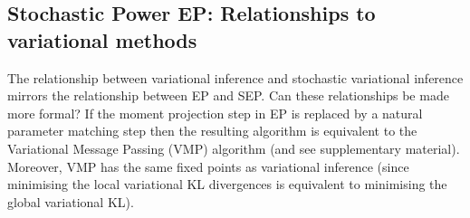 \subsection{Stochastic Power EP: Relationships to variational methods}
%
The relationship between variational inference and stochastic variational inference \cite{hoffman:svi} mirrors the relationship between EP and SEP. 
%
Can these relationships be made more formal? If the moment projection step in EP is replaced by a natural parameter matching step then the resulting algorithm is equivalent to the Variational Message Passing (VMP) algorithm \cite{minka:divergence} (and see supplementary material). Moreover, VMP has the same fixed points as variational inference \cite{winn:vmp} (since minimising the local variational KL divergences is equivalent to minimising the global variational KL). 


%

